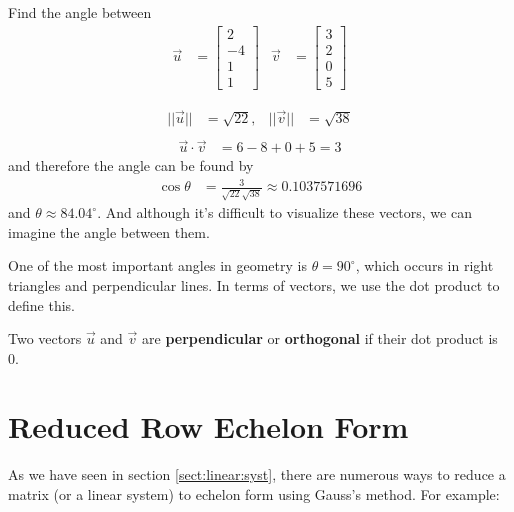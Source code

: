 \begin{example}
Find the angle between 
%
\begin{align*}
\vec{u} & = \begin{bmatrix}
2 \\ -4 \\ 1 \\ 1
\end{bmatrix} & \vec{v} & = \begin{bmatrix}
3 \\ 2 \\ 0 \\ 5 
\end{bmatrix}
\end{align*}

\solution

\begin{align*}
||\vec{u}|| & =\sqrt{22}, & ||\vec{v}|| & = \sqrt{38} \\
\end{align*}
\begin{align*}
\vec{u} \cdot \vec{v} & = 6-8+0+5 = 3 
\end{align*}
and therefore the angle can be found by 
%
\begin{align*}
\cos \theta & = \frac{3}{\sqrt{22}\sqrt{38}} \approx 0.1037571696
\end{align*}
and $\theta \approx 84.04^{\circ}$.   And although it's difficult to visualize these vectors, we can imagine the angle between them.  
\end{example}

One of the most important angles in geometry is $\theta=90^{\circ}$, which occurs in right triangles and perpendicular lines.  In terms of vectors, we use the dot product to define this.  

\begin{definition}
Two vectors $\vec{u}$ and $\vec{v}$ are \textbf{perpendicular} or \textbf{orthogonal} if their dot product is 0.  
\end{definition}



\vfill \pagebreak

\section{Reduced Row Echelon Form} \label{sect:reduced:row:echelon}

As we have seen in section \ref{sect:linear:syst}, there are numerous ways to reduce a matrix (or a linear system) to echelon form using Gauss's method.  For example:

